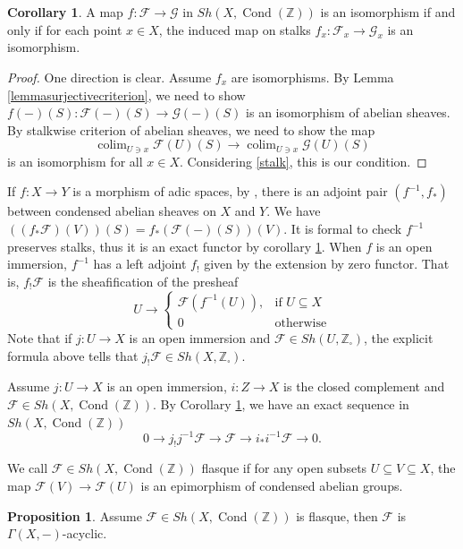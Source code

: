 \documentclass{article}
\theoremstyle{definition}
\newtheorem{proposition}[theorem]{Proposition}
\newtheorem{corollary}[theorem]{Corollary}
\def\sF{{\mathscr{F}}}
\def\sG{{\mathscr{G}}}
\def\bZ{{\mathbb Z}}
\DeclareMathOperator{\colim}{colim}
\DeclareMathOperator{\cond}{Cond}
\begin{document}
\begin{corollary}\label{corollarystalk}
	A map $f:\sF\to \sG$ in $\mathit{Sh}(X,\cond(\bZ))$ is an isomorphism if and only if for each point $x\in X$, the induced map on stalks $f_x: \sF_x\to \sG_x$ is an isomorphism.
\end{corollary}

\begin{proof}
	One direction is clear. Assume $f_x$ are isomorphisms. By Lemma \ref{lemmasurjectivecriterion}, we need to show $f(-)(S): \sF(-)(S)\to \sG(-)(S)$ is an isomorphism of abelian sheaves. By stalkwise criterion of abelian sheaves, we need to show the map 
	$$\colim_{U\ni x}\sF(U)(S)\to \colim_{U\ni x}\sG(U)(S)$$ is an isomorphism for all $x\in X$. Considering  \eqref{stalk}, this is our condition.
	\end{proof}
	
	If $f:X\to Y$ is a morphism of adic spaces, by \cite[\S 17]{kashiwara2006categories}, there is an adjoint pair $(f^{-1},f_*)$ between condensed abelian sheaves on $X$ and $Y$. We have $((f_*\sF)(V))(S)=f_*(\sF(-)(S))(V)$. It is formal to check $f^{-1}$ preserves stalks, thus it is an exact functor by corollary \ref{corollarystalk}. When $f$ is an open immersion, $f^{-1}$ has a left adjoint $f_!$ given by the extension by zero functor. That is, $f_!\sF$ is the sheafification of the presheaf
	$$U\to \begin{cases}
	\sF(f^{-1}(U)), & \text{if } U\subseteq X\\
	0 & \text{otherwise} 
	\end{cases}$$
	Note that if $j:U\to X$ is an open immersion and $\sF\in  \mathit{Sh}(U,\bZ_\square)$, the explicit formula above tells that $j_!\sF \in  \mathit{Sh}(X,\bZ_\square)$.
	
	 Assume $j:U\to X$ is an open immersion, $i:Z\to X$ is the closed complement and $\sF\in \mathit{Sh}(X,\cond(\bZ))$. By Corollary \ref{corollarystalk}, we have an exact sequence in $\mathit{Sh}(X,\cond(\bZ))$
	$$0\to j_!j^{-1}\sF\to \sF\to i_*i^{-1}\sF\to 0.$$
	
	We call $\sF\in \mathit{Sh}(X,\cond(\bZ))$ flasque if for any open subsets $U\subseteq V\subseteq X$, the map 
	$\sF(V)\to \sF(U)$ is an epimorphism of condensed abelian groups.
	
	\begin{proposition}\label{propositionacycofflasque}
		Assume $\sF\in \mathit{Sh}(X,\cond(\bZ))$ is flasque, then $\sF$ is $\Gamma(X,-)$-acyclic.
	\end{proposition}	
	
\end{document}
